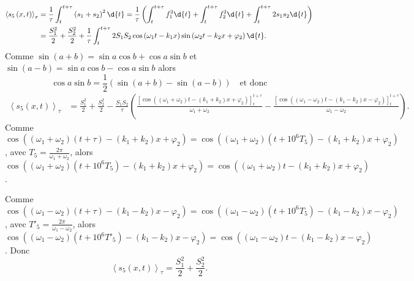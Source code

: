 \begin{corrige}
	\begin{align*}
		\left< s_5\left( x,t \right) \right>_{\tau} &= \frac{1}{\tau} \int_t^{t+\tau} \left( s_1 + s_2 \right)^2  \d{t} = \frac{1}{\tau} \left(\int_t^{t+\tau} f^2_1  \d{t} + \int_t^{t+\tau} f^2_2  \d{t} + \int_t^{t+\tau} 2 s_1 s_2  \d{t} \right)\\
		&= \frac{S_1^2}{2} + \frac{S_2^2}{2} + \frac{1}{\tau} \int_t^{t+\tau} 2S_1 S_2 \cos \left( \omega_1 t - k_1 x \right) \sin \left( \omega_2 t - k_2 x  + \varphi_2\right) \d{t}.
	\end{align*}
	Comme $\sin \left( a+b \right) =  \sin a \cos b + \cos a \sin b$ et $\sin \left( a-b \right) =  \sin a \cos b - \cos a \sin b$ alors $$\cos a \sin b = \frac{1}{2}\left( \sin\left( a+b \right) - \sin\left( a-b \right) \right) \quad \text{et donc}$$
	\begin{align*}
		\left< s_5\left( x,t \right) \right>_{\tau} &= \frac{S_1^2}{2} + \frac{S_2^2}{2} - \frac{S_1S_2}{\tau} \left( \frac{\left[ \cos\left( \left(\omega_1 + \omega_2\right)t - \left( k_1 + k_2 \right)x + \varphi_2 \right) \right]^{t+\tau}_{t}}{\omega_1+\omega_2} - \frac{\left[ \cos\left( \left(\omega_1 - \omega_2\right)t - \left( k_1 - k_2 \right)x - \varphi_2 \right) \right]^{t+\tau}_{t} }{\omega_1-\omega_2} \right).
	\end{align*}
	Comme $\cos\left( \left(\omega_1 + \omega_2\right)\left( t+\tau \right) - \left( k_1 + k_2 \right)x + \varphi_2\right) = \cos\left( \left(\omega_1 + \omega_2\right)\left( t+10^6 T_5\right) - \left( k_1 + k_2 \right)x + \varphi_2 \right)$, avec $T_5 = \frac{2\pi}{\omega_1+\omega_2}$, alors
	$\cos\left( \left(\omega_1 + \omega_2\right)\left( t+10^6 T_5\right) - \left( k_1 + k_2 \right)x + \varphi_2 \right) = \cos\left( \left(\omega_1 + \omega_2\right)t - \left( k_1 + k_2 \right)x + \varphi_2 \right)$.

	Comme $\cos\left( \left(\omega_1 - \omega_2\right)\left( t+\tau \right) - \left( k_1 - k_2 \right)x - \varphi_2\right) = \cos\left( \left(\omega_1 - \omega_2\right)\left( t+10^6 T_5\right) - \left( k_1 - k_2 \right)x - \varphi_2 \right)$, avec $T'_5 = \frac{2\pi}{\omega_1-\omega_2}$, alors
	$\cos\left( \left(\omega_1 - \omega_2\right)\left( t+10^6 T'_5\right) - \left( k_1 - k_2 \right)x - \varphi_2 \right) = \cos\left( \left(\omega_1 - \omega_2\right)t - \left( k_1 - k_2 \right)x - \varphi_2 \right)$.
	Donc
	$$
	\left< s_5\left( x,t \right) \right>_{\tau} = \frac{S_1^2}{2} + \frac{S_2^2}{2}.
	$$

	\end{corrige}

